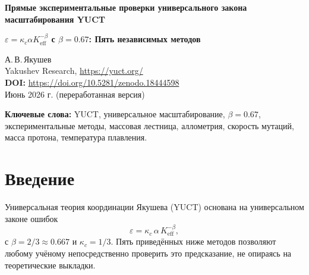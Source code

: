 \documentclass[12pt,a4paper]{article}
\newcommand{\Ke}{K_{\mathrm{eff}}}
\begin{document}
	
	\begin{center}
		{\Large \textbf{Прямые экспериментальные проверки универсального закона масштабирования YUCT}}
	\end{center}
	\begin{center}
		{\Large \textbf{\(\varepsilon = \kappa_c \alpha \Ke^{-\beta}\) с \(\beta = 0.67\): Пять независимых методов}}
	\end{center}
	
	\vspace{0.5cm}
	\noindent
	А.\,В.\,Якушев\\
	Yakushev Research, \url{https://yuct.org/}\\
	\vspace{0.3cm}
	\textbf{DOI:} \url{https://doi.org/10.5281/zenodo.18444598}\\
	\noindent
	Июнь 2026 г. (переработанная версия)
	
	\vspace{0.5cm}
	
	\begin{abstract}
		\noindent
		В данной заметке представлены пять независимых, численно проверенных экспериментальных
		методов, позволяющих непосредственно подтвердить центральное предсказание
		Универсальной теории координации Якушева (YUCT): универсальный
		показатель масштабирования ошибок равен \(\beta = 0.67\). Каждый метод использует
		общедоступные данные, требует только калькулятора и может быть воспроизведён
		студентом за один день. Тесты охватывают физику частиц, биологию,
		эволюционную генетику и материаловедение.
	\end{abstract}
	
	\vspace{0.5cm}
	
	\noindent
	\textbf{Ключевые слова:} YUCT, универсальное масштабирование, \(\beta = 0.67\), экспериментальные
	методы, массовая лестница, аллометрия, скорость мутаций, масса протона, температура плавления.
	
	\section{Введение}
	
	Универсальная теория координации Якушева (YUCT) основана на универсальном законе ошибок
	\begin{equation}\label{eq:error-law}
		\varepsilon = \kappa_c \, \alpha \, \Ke^{-\beta},
	\end{equation}
	с \(\beta = 2/3 \approx 0.667\) и \(\kappa_c = 1/3\). Пять приведённых ниже
	методов позволяют любому учёному непосредственно проверить это предсказание,
	не опираясь на теоретические выкладки.
	
\end{document}
